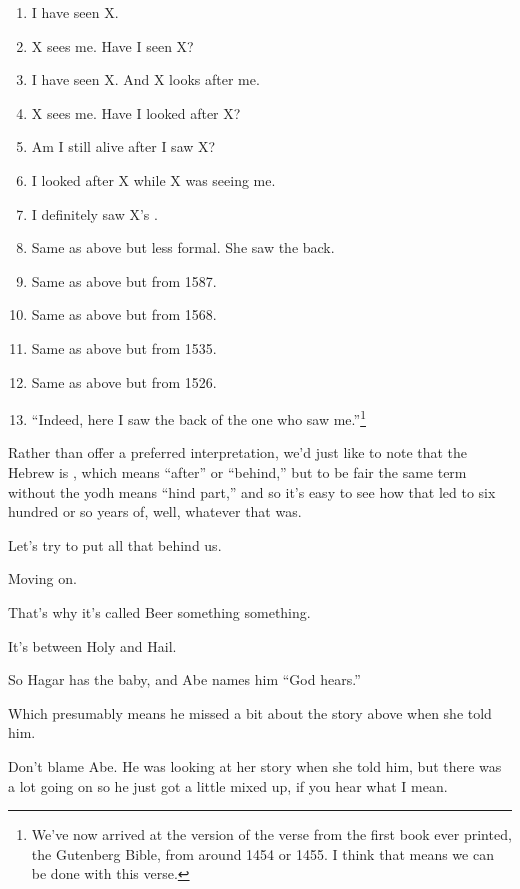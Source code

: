 {{	\begin{enumerate}
	\item I have seen X.
	\item X sees me. Have I seen X?
	\item I have seen X. And X looks after me.
	\item X sees me. Have I looked after X?
	\item Am I still alive after I saw X?
	\item I looked after X while X was seeing me.
	\item I definitely saw X's .
	\item Same as above but less formal. She saw the back.
	\item Same as above but from 1587.
	\item Same as above but from 1568.
	\item Same as above but from 1535.
	\item Same as above but from 1526.
	\item ``Indeed, here I saw the back of the one who saw me.''\footnote{We've now arrived at the version of the verse from the first book ever printed, the Gutenberg Bible, from around 1454 or 1455. I think that means we can be done with this verse.}
	\end{enumerate}

	Rather than offer a preferred interpretation, we'd just like to note that the Hebrew is , which means ``after'' or ``behind,'' but to be fair the same term without the yodh  means ``hind part,'' and so it's easy to see how that led to six hundred or so years of, well, whatever that was.

	Let's try to put all that behind us.}

	Moving on.
}

{
}
{
}
{
	That's why it's called Beer something something.%

	It's between Holy and Hail.
}

{
}
{
}
{
	So Hagar has the baby, and Abe names him ``God hears.''
	
	Which presumably means he missed a bit about the story above when she told him.%

	Don't blame Abe. He was looking at her story when she told him,
	but there was a lot going on so he just got a little mixed up,
	if you hear what I mean.
}

